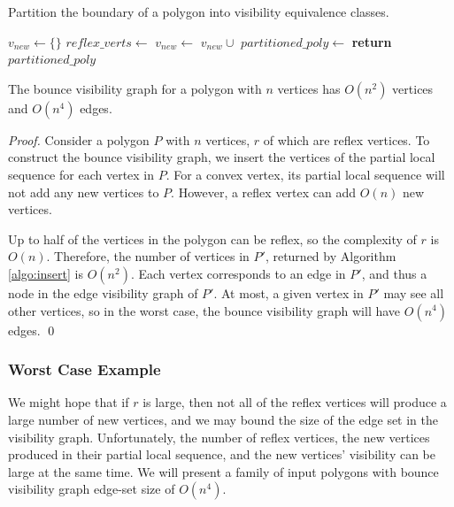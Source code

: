 \documentclass[]{styles/svproc}  %
\begin{document}
\begin{algorithm}
\caption{Partition the boundary of a polygon into visibility
equivalence classes.}
\label{algo:insert}
\begin{algorithmic}
\State $v_{new} \gets \{\}$
\State $reflex\_verts \gets$ 
 
        \State $v_{new} \gets$ $v_{new} \cup$ 
    \EndFor
\EndFor
\State $partitioned\_poly \gets$ 
\State \textbf{return} $partitioned\_poly$
\EndProcedure
\end{algorithmic}
\end{algorithm}

\begin{proposition} The bounce visibility graph for a polygon with $n$ vertices has 
$O(n^2)$ vertices and $O(n^4)$ edges.
\end{proposition}

\begin{proof}

Consider a polygon $P$ with $n$ vertices, $r$ of which are reflex vertices. To
construct the bounce visibility graph, we insert the vertices of the partial
local sequence for each vertex in $P$. For a convex vertex, its partial local sequence 
will not add any new vertices to $P$. However, a reflex vertex can add $O(n)$ new vertices. 

Up to half of the vertices in the polygon can be reflex, so the complexity of
$r$ is $O(n)$. Therefore, the number of vertices in $P'$, returned by Algorithm
\ref{algo:insert} is $O(n^2)$. Each vertex corresponds to an edge in $P'$, and
thus a node in the edge visibility graph of $P'$. At most, a given vertex in $P'$ may see all other vertices, so in the worst
case, the bounce visibility graph will have $O(n^4)$ edges.
\qed

\end{proof}

\subsubsection{Worst Case Example}

We might hope that if $r$ is large, then not all of the reflex vertices will
produce a large number of new vertices, and we may bound the size of the edge
set in the visibility graph. Unfortunately, the number of reflex
vertices, the new vertices produced in their partial local sequence, and the new
vertices' visibility can be large at the same time. We will present a family of
input polygons with bounce visibility graph edge-set size of $O(n^4)$.
\end{document}
